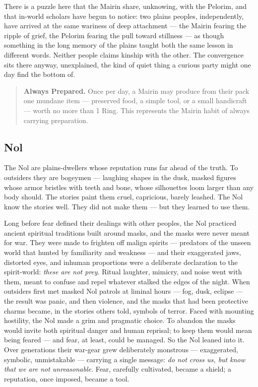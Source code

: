 There is a puzzle here that the Mairin share, unknowing, with the Pelorim, and that in-world scholars have begun to notice: two plains peoples, independently, have arrived at the same wariness of deep attachment --- the Mairin fearing the ripple of grief, the Pelorim fearing the pull toward stillness --- as though something in the long memory of the plains taught both the same lesson in different words. Neither people claims kinship with the other. The convergence sits there anyway, unexplained, the kind of quiet thing a curious party might one day find the bottom of.

\begin{quote}
\textbf{Always Prepared.} Once per day, a Mairin may produce from their pack one mundane item --- preserved food, a simple tool, or a small handicraft --- worth no more than 1 Ring. This represents the Mairin habit of always carrying preparation.
\end{quote}

\subsection{Nol}

The Nol are plains-dwellers whose reputation runs far ahead of the truth. To outsiders they are bogeymen --- laughing shapes in the dusk, masked figures whose armor bristles with teeth and bone, whose silhouettes loom larger than any body should. The stories paint them cruel, capricious, barely leashed. The Nol know the stories well. They did not make them --- but they learned to use them.

Long before fear defined their dealings with other peoples, the Nol practiced ancient spiritual traditions built around masks, and the masks were never meant for war. They were made to frighten off malign spirits --- predators of the unseen world that hunted by familiarity and weakness --- and their exaggerated jaws, distorted eyes, and inhuman proportions were a deliberate declaration to the spirit-world: \textit{these are not prey}. Ritual laughter, mimicry, and noise went with them, meant to confuse and repel whatever stalked the edges of the night. When outsiders first met masked Nol patrols at liminal hours --- fog, dusk, eclipse --- the result was panic, and then violence, and the masks that had been protective charms became, in the stories others told, symbols of terror. Faced with mounting hostility, the Nol made a grim and pragmatic choice. To abandon the masks would invite both spiritual danger and human reprisal; to keep them would mean being feared --- and fear, at least, could be managed. So the Nol leaned into it. Over generations their war-gear grew deliberately monstrous --- exaggerated, symbolic, unmistakable --- carrying a single message: \textit{do not cross us, but know that we are not unreasonable.} Fear, carefully cultivated, became a shield; a reputation, once imposed, became a tool.


